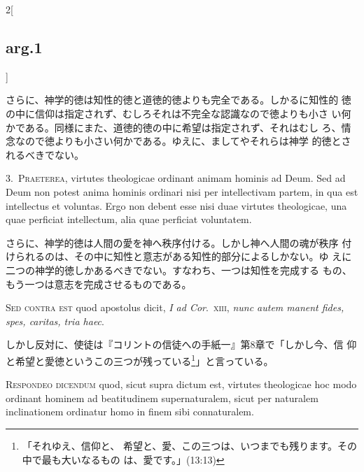 \documentclass[paper=a4paper,fontsize=10pt,jafontsize=9pt,titlepage]{jlreq}
\begin{document}
\begin{paracol}{2}[\subsection{arg.1}]
\switchcolumn

さらに、神学的徳は知性的徳と道徳的徳よりも完全である。しかるに知性的
 徳の中に信仰は指定されず、むしろそれは不完全な認識なので徳よりも小さ
 い何かである。同様にまた、道徳的徳の中に希望は指定されず、それはむし
 ろ、情念なので徳よりも小さい何かである。ゆえに、ましてやそれらは神学
 的徳とされるべきでない。


3.~{\scshape Praeterea}, virtutes theologicae ordinant animam hominis
ad Deum. Sed ad Deum non potest anima hominis ordinari nisi per
intellectivam partem, in qua est intellectus et voluntas. Ergo non
debent esse nisi duae virtutes theologicae, una quae perficiat
intellectum, alia quae perficiat voluntatem.

\switchcolumn

さらに、神学的徳は人間の愛を神へ秩序付ける。しかし神へ人間の魂が秩序
 付けられるのは、その中に知性と意志がある知性的部分によるしかない。ゆ
 えに二つの神学的徳しかあるべきでない。すなわち、一つは知性を完成する
 もの、もう一つは意志を完成させるものである。

\switchcolumn*[\subsection{s.c.}]

{\scshape Sed contra est} quod apostolus dicit, {\itshape I ad
Cor}.~{\scshape xiii}, {\itshape nunc autem manent fides, spes,
caritas, tria haec}.

\switchcolumn

しかし反対に、使徒は『コリントの信徒への手紙一』第8章で「しかし今、信
 仰と希望と愛徳というこの三つが残っている\footnote{「それゆえ、信仰と、
 希望と、愛、この三つは、いつまでも残ります。その中で最も大いなるもの
 は、愛です。」(13:13)}」と言っている。\label{fides_spes_caritas}


{\scshape Respondeo dicendum} quod, sicut supra dictum est, virtutes
theologicae hoc modo ordinant hominem ad beatitudinem supernaturalem,
sicut per naturalem inclinationem ordinatur homo in finem sibi
 connaturalem.


\end{paracol}
\end{document}
